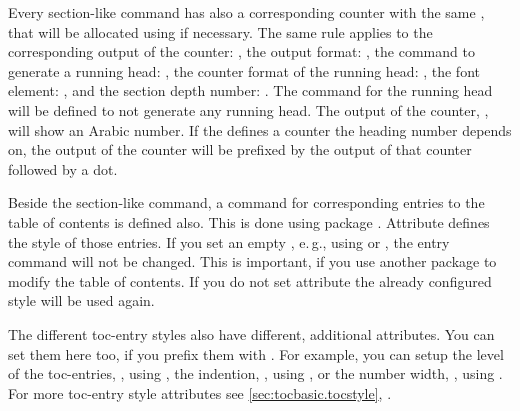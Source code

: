 Every section-like command has also a corresponding counter with the same
, that will be allocated using  if
necessary. The same rule applies to the corresponding output of the counter:
, the output format: , the
command to generate a running head: , the counter
format of the running head: , the font element:
, and the section depth number:
. The command for the running head
 will be defined to not generate any running head. The
output of the counter, , will show an Arabic number. If
the   defines a counter the heading number
depends on, the output of the counter will be prefixed by the output of that
counter followed by a dot.

Beside the section-like command, a command for corresponding
entries to the table of contents is defined also. This is done using package
.
Attribute  defines the style of those entries. If you set an
empty , e.\,g., using  or
, the entry command will not be changed. This is
important, if you use another package to modify the table of contents. If you
do not set attribute  the already configured style will be
used again.

The different toc-entry styles also have different, additional
attributes. You can set them here too, if you prefix them with
. For example, you can setup the level of the toc-entries,
, using , the indention, , using
, or the number width, , using
. For more toc-entry style attributes see
\autoref{sec:tocbasic.tocstyle}, .

